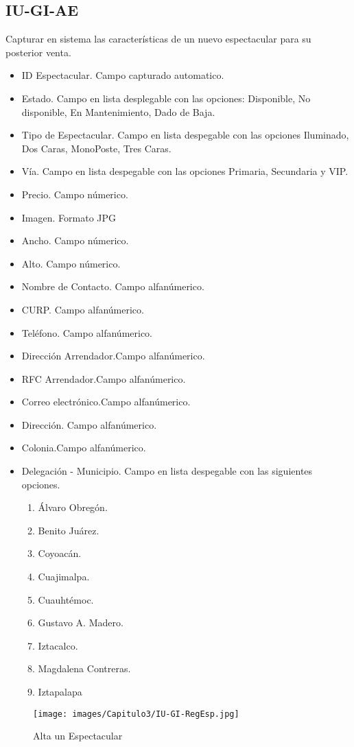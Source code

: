 \subsection{IU-GI-AE}
    Capturar en sistema las características de un nuevo espectacular para su posterior venta.
    \begin{itemize}
    \item ID Espectacular. Campo capturado automatico.
    \item Estado. Campo en lista desplegable con las opciones: Disponible, No disponible, En Mantenimiento, Dado de Baja.
    \item Tipo de Espectacular. Campo en lista despegable con las opciones Iluminado, Dos Caras, MonoPoste, Tres Caras.
    \item Vía. Campo en lista despegable con las opciones Primaria, Secundaria y VIP.
    \item Precio. Campo númerico.
    \item Imagen. Formato JPG
    \item Ancho. Campo númerico.
    \item Alto. Campo númerico.
    \item Nombre de Contacto. Campo alfanúmerico.
    \item CURP. Campo alfanúmerico.
    \item Teléfono. Campo alfanúmerico.
    \item Dirección Arrendador.Campo alfanúmerico.
    \item RFC Arrendador.Campo alfanúmerico.
    \item Correo electrónico.Campo alfanúmerico.
    \item Dirección. Campo alfanúmerico.
    \item Colonia.Campo alfanúmerico.
    \item Delegación - Municipio. Campo en lista despegable con las siguientes opciones.
    \begin{enumerate}
        \item Álvaro Obregón.
        \item Benito Juárez.
        \item Coyoacán.
        \item Cuajimalpa.
        \item Cuauhtémoc.
        \item Gustavo A. Madero.
        \item Iztacalco.
        \item Magdalena Contreras.
        \item Iztapalapa
    \end{enumerate}
    \end{itemize}
\begin{figure}[htbp!]
    \texttt{[image: images/Capitulo3/IU-GI-RegEsp.jpg]}
    \caption{ Alta un Espectacular}
    \label{fig:my_label}
\end{figure}
\clearpage


